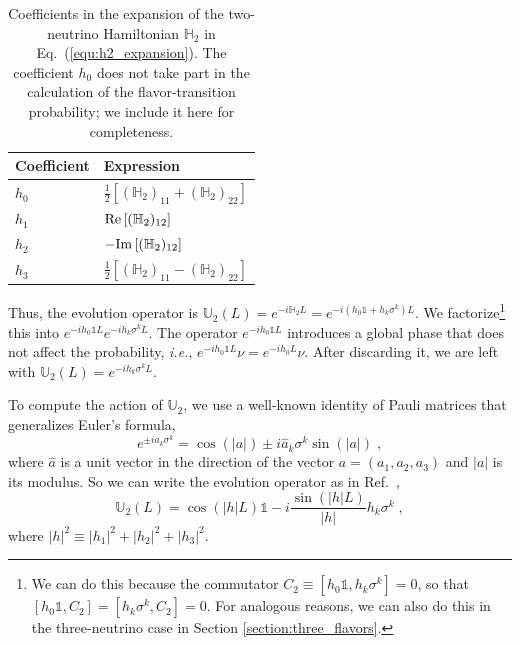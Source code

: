 \documentclass[final,5p,times,twocolumn]{elsarticle}
\newcommand{\ie}{{\it i.e.}}
\newcommand{\eq}{Eq.}
\newcommand{\Ref}{Ref.}
\newcommand{\equ}[1]{\eq~(\ref{equ:#1})}
\begin{document}
{\def\arraystretch{1.2}
\begin{table}[t!]
  \begin{tabular}{ll}
   Coefficient & Expression \\
   \hline
   $h_0$ & $\frac{1}{2}\left[(\mathbb{H}_2)_{11}+(\mathbb{H}_2)_{22}\right]$ \\
   $h_1$ & ${\rm Re}\left[ (\mathbb{H}_2)_{12} \right]$ \\
   $h_2$ & $-{\rm Im}\left[ (\mathbb{H}_2)_{12} \right]$ \\
   $h_3$ & $\frac{1}{2}\left[(\mathbb{H}_2)_{11}-(\mathbb{H}_2)_{22}\right]$ \\
  \end{tabular}
  \caption{\label{tab:h2_coefficients}Coefficients in the expansion of the two-neutrino Hamiltonian $\mathbb{H}_2$ in \equ{h2_expansion}.  The coefficient $h_0$ does not take part in the calculation of the flavor-transition probability; we include it here for completeness.}
\end{table}
}

Thus, the evolution operator is $\mathbb{U}_2\left(L\right) = e^{-i \mathbb{H}_2 L} = e^{-i(h_0 \mathbb{1}+h_k\sigma^k)L}$.  We factorize\footnote{We can do this because the commutator $C_2\equiv\left[h_0 \mathbb{1},h_k\sigma^k\right]=0$, so that $\left[h_0 \mathbb{1}, C_2\right]=\left[h_k\sigma^k, C_2\right]=0$.  For analogous reasons, we can also do this in the three-neutrino case in Section \ref{section:three_flavors}.} this into $e^{-ih_0\mathbb{1}L} e^{-ih_k\sigma^kL}$.  The operator $e^{-ih_0\mathbb{1}L}$ introduces a global phase that does not affect the probability, \ie, $e^{-ih_0\mathbb{1}L}\nu =e^{-ih_0L}\nu$.  After discarding it, we are left with $\mathbb{U}_2(L) =  e^{-ih_k\sigma^kL}$. 

To compute the action of $\mathbb{U}_2$, we use a well-known identity of Pauli matrices that generalizes Euler's formula,
\begin{equation}
 \label{equ:pauli_identity}
 e^{\pm i a_k \sigma^k}
 =
 \cos\left(\left\vert a \right\vert \right) 
 \pm 
 i \hat{a}_k\sigma^k\sin\left(\left\vert a\right\vert \right) \;, 
\end{equation}
where $\hat{a}$ is a unit vector in the direction of the vector $a = (a_1, a_2, a_3)$ and $\lvert a \rvert$ is its modulus.  So we can write the evolution operator as in \Ref\ \cite{Ohlsson:1999xb},
\begin{equation}
 \label{equ:evol_op_2nu}
 \mathbb{U}_2\left(L\right) 
 =
 \cos\left(\left\vert h\right\vert L\right) \mathbb{1}
 -
 i \frac{\sin\left(\left\vert h\right\vert L\right)}{\lvert h \rvert} h_k\sigma^k  \;,
\end{equation}
where $\lvert h \rvert^2 \equiv \lvert h_1 \rvert^2 + \lvert h_2 \rvert^2 + \lvert h_3 \rvert^2$.
\end{document}
